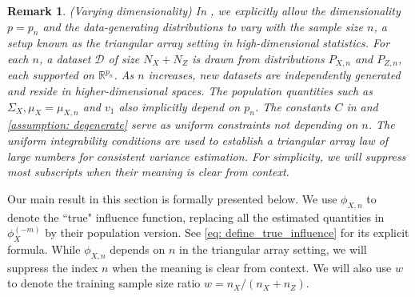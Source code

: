\documentclass[11pt]{article}
\newtheorem{remark}{Remark}[section]
\begin{document}
\begin{remark}\label{remark: triangular array}(Varying dimensionality) In , we explicitly allow the dimensionality $p=p_n$ and the data-generating distributions to vary with the sample size $n$, a setup known as the triangular array setting in high-dimensional statistics. For each $n$, a dataset $\mathcal{D}$ of size $N_X+N_Z$ is drawn from distributions $P_{X, n}$ and $P_{Z, n}$, each supported on $\mathbb{R}^{p_n}$. As $n$ increases, new datasets are independently generated and reside in higher-dimensional spaces. The population quantities such as $\Sigma_X, \mu_X = \mu_{X,n}$ and $v_1$ also implicitly depend on $p_n$. The constants $C$ in  and \ref{assumption: degenerate} serve as uniform constraints not depending on $n$. The uniform integrability conditions are used to establish a triangular array law of large numbers for consistent variance estimation. For simplicity, we will suppress most subscripts when their meaning is clear from context.
\end{remark}

Our main result in this section is formally presented below. We use $\phi_{X,n}$ to denote the ``true" influence function, replacing all the estimated quantities in $\phi_X^{(-m)}$ by their population version. See \eqref{eq: define_true_influence} for its explicit formula. While $\phi_{X, n}$ depends on $n$ in the triangular array setting, we will suppress the index $n$ when the meaning is clear from context. We will also use $w$ to denote the training sample size ratio $w=n_X /\left(n_X+n_Z\right)$.
\end{document}
